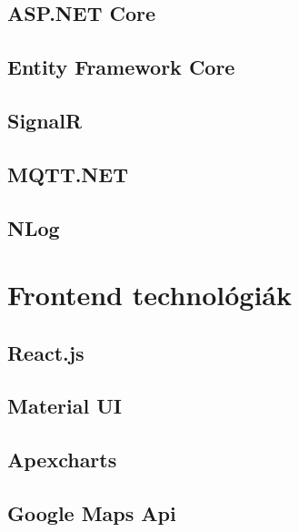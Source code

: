 \subsection{ASP.NET Core}
\subsection{Entity Framework Core}
\subsection{SignalR}
\subsection{MQTT.NET}
\subsection{NLog}

\section{Frontend technológiák}
\subsection{React.js}
\subsection{Material UI}
\subsection{Apexcharts}
\subsection{Google Maps Api}

